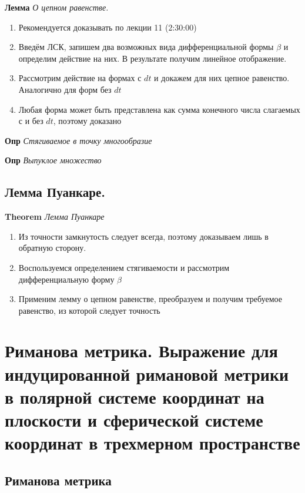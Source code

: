 \documentclass[a4paper, 14pt]{article}
\begin{document}
    \textbf{Лемма} \textit{О цепном равенстве.}
    
    \begin{enumerate}
        \item Рекомендуется доказывать по лекции 11 (2:30:00)
        \item Введём ЛСК, запишем два возможных вида дифференциальной формы $\beta$ и определим действие на них.
        В результате получим линейное отображение.
        \item Рассмотрим действие на формах с $dt$ и докажем для них цепное равенство.
        Аналогично для форм без $dt$
        \item Любая форма может быть представлена как сумма конечного числа слагаемых с и без $dt$, поэтому доказано
    \end{enumerate}
    
    \textbf{Опр} \textit{Стягиваемое в точку многообразие}
    
    \textbf{Опр} \textit{Выпуклое множество}
    
    \subsection{Лемма Пуанкаре.}
    
    \textbf{Theorem} \textit{Лемма Пуанкаре}
    
    \begin{enumerate}
        \item Из точности замкнутость следует всегда, поэтому доказываем лишь в обратную сторону.
        \item Воспользуемся определением стягиваемости и рассмотрим дифференциальную форму $\beta$
        \item Применим лемму о цепном равенстве, преобразуем и получим требуемое равенство, из которой следует точность
    \end{enumerate}
    
    \section{Риманова метрика.
    Выражение для индуцированной римановой метрики в полярной системе координат на плоскости и сферической системе
    координат в трехмерном пространстве}
    
    \subsection{Риманова метрика}
    
\end{document}
